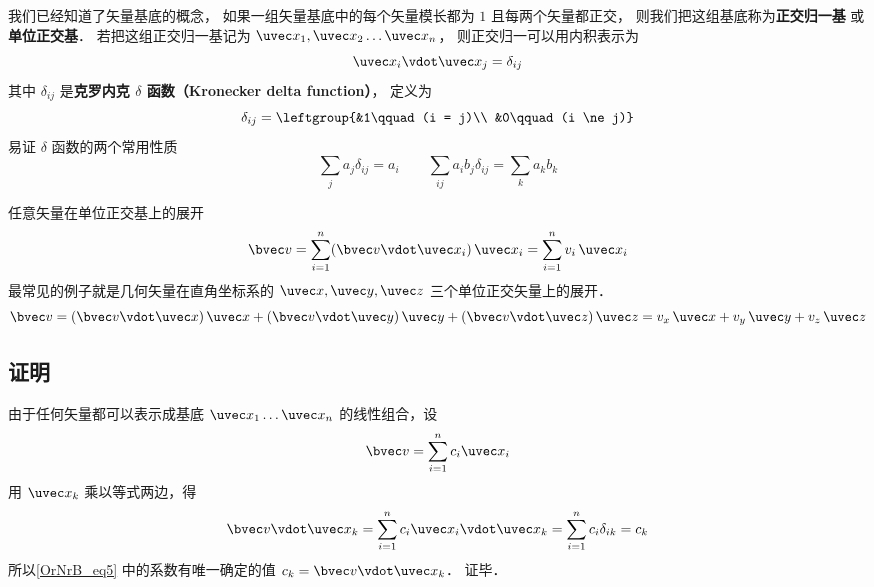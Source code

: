 

我们已经知道了矢量基底的概念， 如果一组矢量基底中的每个矢量模长都为 $1$ 且每两个矢量都正交， 则我们把这组基底称为\textbf{正交归一基} 或\textbf{单位正交基}． 若把这组正交归一基记为 $\uvec x_1,\uvec x_2\dots\uvec x_n$， 则正交归一可以用内积表示为
\begin{equation}
\uvec x_i \vdot \uvec x_j = \delta_{ij}
\end{equation}
其中 $\delta_{ij}$ 是\textbf{克罗内克 $\delta$ 函数（Kronecker delta function）}， 定义为
\begin{equation}\label{OrNrB_eq2}
\delta_{ij} = \leftgroup{&1\qquad (i = j)\\ &0\qquad (i \ne j)}
\end{equation}
易证 $\delta$ 函数的两个常用性质
\begin{equation}
\sum_j a_j \delta_{ij} = a_i
\qquad
\sum_{ij} a_i b_j \delta_{ij} = \sum_k a_k b_k
\end{equation}

任意矢量在单位正交基上的展开
 \begin{equation}\label{OrNrB_eq1}
\bvec v = \sum_{i = 1}^n (\bvec v\vdot\uvec x_i)\,\uvec x_i = \sum_{i = 1}^n v_i \,\uvec x_i
\end{equation}
最常见的例子就是几何矢量在直角坐标系的 $\uvec x, \uvec y, \uvec z$ 三个单位正交矢量上的展开．
 \begin{equation}
\bvec v = (\bvec v \vdot \uvec x)\,\uvec x + (\bvec v \vdot \uvec y)\,\uvec y + (\bvec v \vdot \uvec z)\,\uvec z = v_x \,\uvec x + v_y \,\uvec y + v_z \,\uvec z
\end{equation} 

\subsection{证明}
由于任何矢量都可以表示成基底 $\uvec x_1 \dots \uvec x_n$ 的线性组合，设
\begin{equation}\label{OrNrB_eq5}
\bvec v = \sum_{i = 1}^n c_i \uvec x_i
\end{equation} 
用 $\uvec x_k$ 乘以等式两边，得
\begin{equation}
\bvec v \vdot \uvec x_k = \sum_{i = 1}^n  c_i \uvec x_i \vdot\uvec x_k = \sum_{i = 1}^n c_i \delta_{ik}  = c_k
\end{equation}
所以\autoref{OrNrB_eq5} 中的系数有唯一确定的值 $c_k = \bvec v \vdot\uvec x_k$． 证毕．

